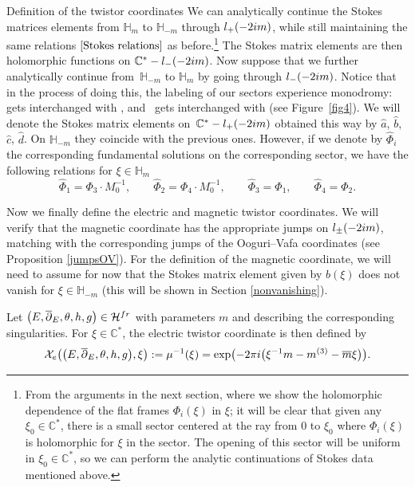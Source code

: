 \documentclass[11pt]{article}
\numberwithin{equation}{section}
\numberwithin{equation}{section}
\begin{document}
\begin{subsubsection} {Definition of the twistor coordinates}
We can analytically continue the Stokes matrices elements from $\mathbb{H}_m$ to $\mathbb{H}_{-m}$ through \linebreak $l_+({-}2{\rm i}m)$, while still maintaining the same relations $\eqref{Stokes relations}$ as before.\footnote{From the arguments in the next section, where we show the holomorphic dependence of the flat frames $\Phi_i(\xi)$ in $\xi$; it will be clear that given any $\xi_0\in \mathbb{C}^*$, there is a small sector centered at the ray from $0$ to $\xi_0$ where $\Phi_i(\xi)$ is holomorphic for $\xi$ in the sector. The opening of this sector will be uniform in $\xi_0\in \mathbb{C}^*$, so we can perform the analytic continuations of Stokes data mentioned above.} The Stokes matrix elements are then holomorphic functions on $\mathbb{C}^*-l_-(-2{\rm i}m)$. Now suppose that we further analytically continue from~$\mathbb{H}_{-m}$ to $\mathbb{H}_m$ by going through $l_-(-2{\rm i}m)$. Notice that in the process of doing this, the labeling of our sectors experience monodromy:  gets interchanged with , and~ gets interchanged with  (see Figure~\ref{fig4}). We will denote the Stokes matrix elements on~${\mathbb{C}^*-l_+(-2{\rm i}m)}$ obtained this way by $\widehat{a}$, $\widehat{b}$, $\widehat{c}$, $\widehat{d}$. On $\mathbb{H}_{-m}$ they coincide with the previous ones. However, if we denote by $\widehat{\Phi}_i$ the corresponding fundamental solutions on the corresponding sector, we have the following relations for $\xi \in \mathbb{H}_{m}$
\begin{equation}\label{Stokes relations 2}
 \widehat{\Phi}_1=\Phi_3\cdot M_0^{-1},\qquad
 \widehat{\Phi}_2=\Phi_4\cdot M_0^{-1},\qquad
 \widehat{\Phi}_3=\Phi_1,\qquad
 \widehat{\Phi}_4=\Phi_2.
\end{equation}

Now we finally define the electric and magnetic twistor coordinates. We will verify that the magnetic coordinate has the appropriate jumps on $l_{\pm}(-2{\rm i}m)$, matching with the corresponding jumps of the Ooguri--Vafa coordinates (see Proposition \ref{jumpsOV}). For the definition of the magnetic coordinate, we will need to assume for now that the Stokes matrix element given by $b(\xi)$ does not vanish for $\xi \in \mathbb{H}_{-m}$ (this will be shown in Section \ref{nonvanishing}).

\begin{Definition} Let $\bigl(E,\overline{\partial}_E,\theta,h,g\bigr)\in \mathcal{H}^{{\rm fr}}$ with parameters $m$ and  describing the corresponding singularities. For $\xi \in \mathbb{C}^*$, the electric twistor coordinate is then defined by
\begin{equation}\label{defetc}
\mathcal{X}_e\bigl(\bigl(E,\overline{\partial}_E,\theta,h,g\bigr),\xi\bigr):=\mu^{-1}(\xi)=\exp\bigl(-2\pi {\rm i} \bigl(\xi^{-1}m -m^{(3)}-\overline{m}\xi\bigr)\bigr).
\end{equation}
\end{Definition}


\end{subsubsection}
\end{document}
